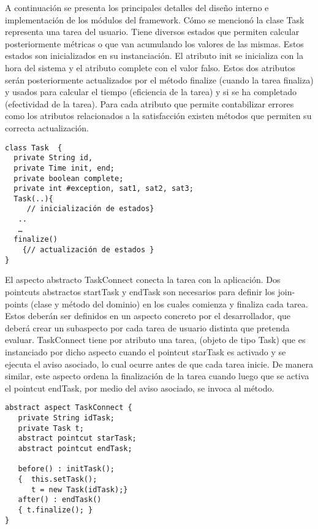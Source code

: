 
A continuación se presenta los principales detalles del diseño interno e implementación de los módulos del framework. Cómo se mencionó la clase Task representa una tarea del usuario. Tiene diversos estados que permiten calcular posteriormente métricas o que van acumulando los valores de las mismas. Estos estados son inicializados en su instanciación. El atributo init se inicializa con la hora del sistema y el atributo complete con el valor falso. Estos dos atributos serán posteriormente actualizados por el método finalize (cuando la tarea finaliza) y usados para calcular el tiempo (eficiencia de la tarea) y si se ha completado (efectividad de la tarea). Para cada atributo que permite contabilizar errores como los atributos relacionados a la satisfacción existen métodos que permiten su correcta actualización. 

\begin{verbatim}
class Task  {
  private String id,
  private Time init, end;
  private boolean complete;
  private int #exception, sat1, sat2, sat3;
  Task(..){
     // inicialización de estados}
   ..
   …
  finalize()
    {// actualización de estados }
}

\end{verbatim}

El aspecto abstracto TaskConnect conecta la tarea con la aplicación. Dos pointcuts abstractos startTask y endTask son necesarios para definir los join-points (clase y método del dominio)  en los cuales comienza y finaliza cada tarea. Estos deberán ser definidos en un aspecto concreto por el desarrollador, que deberá crear un subaspecto por cada tarea de usuario distinta que pretenda evaluar. TaskConnect  tiene por atributo una tarea, (objeto  de tipo Task) que es instanciado por dicho aspecto cuando el pointcut starTask es activado y se ejecuta el aviso asociado, lo cual ocurre antes de que cada tarea inicie. De manera similar, este aspecto ordena la finalización de la tarea cuando luego que se activa el pointcut endTask, por medio del aviso asociado, se invoca al método.  

\begin{verbatim}
abstract aspect TaskConnect {
   private String idTask;
   private Task t;
   abstract pointcut starTask; 
   abstract pointcut endTask;

   before() : initTask();
   {  this.setTask();
      t = new Task(idTask);}
   after() : endTask()
   { t.finalize(); }
}
\end{verbatim}

